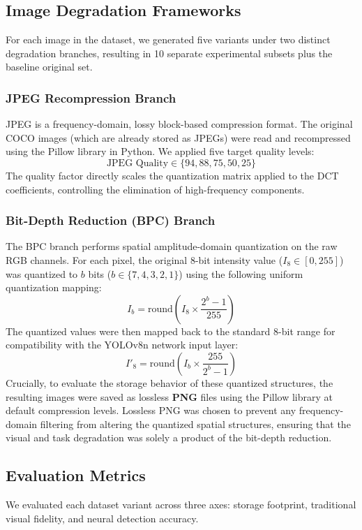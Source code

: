 \documentclass[12pt, a4paper]{article}
\begin{document}
\subsection{Image Degradation Frameworks}
For each image in the dataset, we generated five variants under two distinct degradation branches, resulting in 10 separate experimental subsets plus the baseline original set.

\subsubsection{JPEG Recompression Branch}
JPEG is a frequency-domain, lossy block-based compression format. The original COCO images (which are already stored as JPEGs) were read and recompressed using the Pillow library in Python. We applied five target quality levels:
$$\text{JPEG Quality} \in \{94, 88, 75, 50, 25\}$$
The quality factor directly scales the quantization matrix applied to the DCT coefficients, controlling the elimination of high-frequency components.

\subsubsection{Bit-Depth Reduction (BPC) Branch}
The BPC branch performs spatial amplitude-domain quantization on the raw RGB channels. For each pixel, the original 8-bit intensity value ($I_{8} \in [0, 255]$) was quantized to $b$ bits ($b \in \{7, 4, 3, 2, 1\}$) using the following uniform quantization mapping:
\begin{equation}
I_{b} = \text{round}\left(I_{8} \times \frac{2^b - 1}{255}\right)
\label{eq:quant}
\end{equation}
The quantized values were then mapped back to the standard 8-bit range for compatibility with the YOLOv8n network input layer:
\begin{equation}
I'_{8} = \text{round}\left(I_{b} \times \frac{255}{2^b - 1}\right)
\label{eq:dequant}
\end{equation}
Crucially, to evaluate the storage behavior of these quantized structures, the resulting images were saved as lossless \textbf{PNG} files using the Pillow library at default compression levels. Lossless PNG was chosen to prevent any frequency-domain filtering from altering the quantized spatial structures, ensuring that the visual and task degradation was solely a product of the bit-depth reduction.

\subsection{Evaluation Metrics}
We evaluated each dataset variant across three axes: storage footprint, traditional visual fidelity, and neural detection accuracy.
\end{document}
